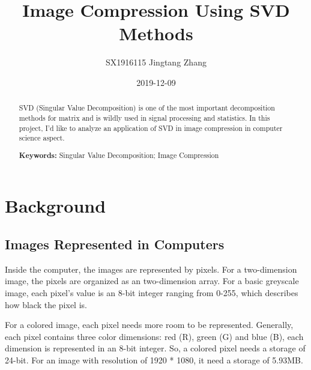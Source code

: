\documentclass{article}
\begin{document}
    \title{Image Compression Using SVD Methods}
    \author{SX1916115 Jingtang Zhang}
    \date{2019-12-09}

    \maketitle

    \newpage

    \begin{abstract}
        SVD (Singular Value Decomposition)
        is one of the most important decomposition methods for matrix
        and is wildly used in signal processing and statistics.
        In this project, I’d like to analyze an application of
        SVD in image compression in computer science aspect.
        \par\textbf{Keywords: } Singular Value Decomposition; Image Compression
    \end{abstract}

    \section{Background}

        \subsection{Images Represented in Computers}
            \par
            Inside the computer, the images are represented by pixels.
            For a two-dimension image,
            the pixels are organized as an two-dimension array.
            For a basic greyscale image,
            each pixel’s value is an 8-bit integer ranging from 0-255,
            which describes how black the pixel is.
            \par
            For a colored image, each pixel needs more room to be represented.
            Generally, each pixel contains three color dimensions: 
            red (R), green (G) and blue (B),
            each dimension is represented in an 8-bit integer. 
            So, a colored pixel needs a storage of 24-bit.
            For an image with resolution of 1920 * 1080,
            it need a storage of 5.93MB.
\end{document}
